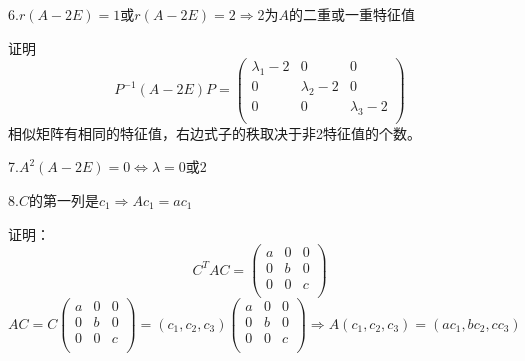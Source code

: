 \documentclass[lang=cn,10pt]{elegantbook}
\begin{document}
\begin{note}
	6.$r(A-2E)=1$或$ r(A-2E)=2\Rightarrow $2为$A$的二重或一重特征值
	
	证明
	\begin{equation*}
		P^{-1}(A-2E)P=\left( \begin{matrix}
			\lambda _1-2&		0&		0\\
			0&		\lambda _2-2&		0\\
			0&		0&		\lambda _3-2\\
		\end{matrix} \right)
	\end{equation*}
	相似矩阵有相同的特征值，右边式子的秩取决于非2特征值的个数。
	
	7.$A^{2}(A-2E)=0$$\Longleftrightarrow $$\lambda=0$或$2$
	
	8.$C$的第一列是$c_{1}\Rightarrow Ac_{1}=ac_{1}$
	
	证明：
	\begin{equation*}
		C^{T}AC=\left( \begin{matrix}
			a&		0&		0\\
			0&		b&		0\\
			0&		0&		c\\
		\end{matrix} \right) 
	\end{equation*}
	\begin{equation*}
		AC=C\left( \begin{matrix}
			a&		0&		0\\
			0&		b&		0\\
			0&		0&		c\\
		\end{matrix} \right)=\left( c_1,c_2,c_3 \right)\left( \begin{matrix}
		a&		0&		0\\
		0&		b&		0\\
		0&		0&		c\\
		\end{matrix} \right)\Rightarrow A \left( c_1,c_2,c_3 \right)=\left( ac_1,bc_2,cc_3 \right)
	\end{equation*}
\end{note}
\end{document}
